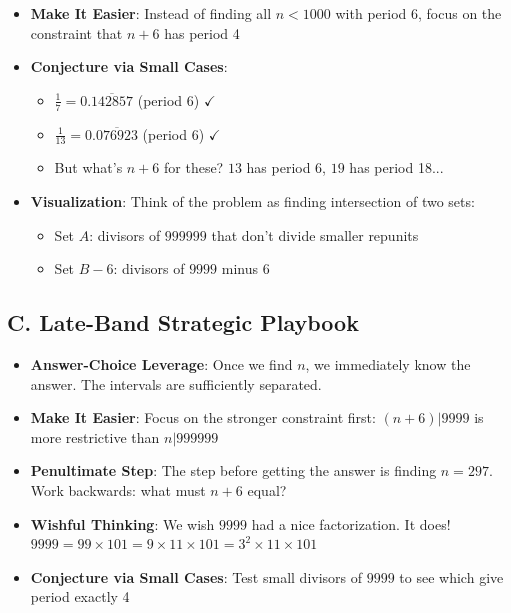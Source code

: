 \documentclass[11pt]{article}
\begin{document}
\begin{strategicbox}
\begin{itemize}[leftmargin=*]
    \item \textbf{Make It Easier}: Instead of finding all $n < 1000$ with period 6, focus on the constraint that $n+6$ has period 4
    
    \item \textbf{Conjecture via Small Cases}: 
    \begin{itemize}
        \item $\frac{1}{7} = 0.\overline{142857}$ (period 6) $\checkmark$
        \item $\frac{1}{13} = 0.\overline{076923}$ (period 6) $\checkmark$
        \item But what's $n+6$ for these? $13$ has period 6, $19$ has period 18...
    \end{itemize}
    
    \item \textbf{Visualization}: Think of the problem as finding intersection of two sets:
    \begin{itemize}
        \item Set $A$: divisors of $999999$ that don't divide smaller repunits
        \item Set $B - 6$: divisors of $9999$ minus 6
    \end{itemize}
\end{itemize}

\subsection*{C. Late-Band Strategic Playbook}
\begin{itemize}[leftmargin=*]
    \item \textbf{Answer-Choice Leverage}: Once we find $n$, we immediately know the answer. The intervals are sufficiently separated.
    
    \item \textbf{Make It Easier}: Focus on the stronger constraint first: $(n+6) | 9999$ is more restrictive than $n | 999999$
    
    \item \textbf{Penultimate Step}: The step before getting the answer is finding $n = 297$. Work backwards: what must $n+6$ equal?
    
    \item \textbf{Wishful Thinking}: We wish $9999$ had a nice factorization. It does! $9999 = 99 \times 101 = 9 \times 11 \times 101 = 3^2 \times 11 \times 101$
    
    \item \textbf{Conjecture via Small Cases}: Test small divisors of $9999$ to see which give period exactly 4
\end{itemize}


\end{strategicbox}
\end{document}
